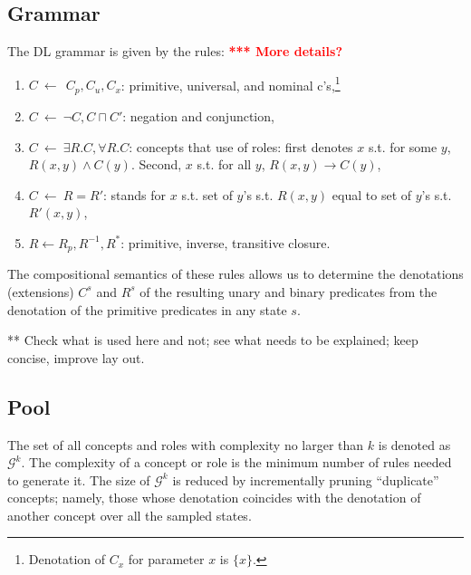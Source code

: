 \documentclass[letterpaper]{article} %
\renewcommand{\S}{\mathcal{S}}
\newcommand{\G}{\mathcal{G}}
\begin{document}
\subsection{Grammar}

The DL grammar is given by the rules: \textcolor{red}{\bf **** More details?}
\begin{enumerate}[{\small$\bullet$}]
  \item $C \ \leftarrow\ \ C_p, C_u, C_x$: primitive, universal, and nominal c's,\footnote{Denotation of $C_x$ for parameter $x$ is $\{x\}$.}
  \item $C \ \leftarrow\  \neg C, C \sqcap C'$: negation and conjunction, 
  \item $C \ \leftarrow\  \exists R.C , \forall R.C$: concepts that use of  roles: first denotes $x$ s.t. for some  $y$,  $R(x,y) \land C(y)$.
  Second,  $x$ s.t. for all $y$, $R(x,y) \rightarrow C(y)$,
  \item $C \ \leftarrow\  R=R'$: stands for $x$ s.t. set of $y$'s  s.t. $R(x,y)$ equal to set of $y$'s s.t. $R'(x,y)$,
    \item $R \leftarrow R_p, R^{-1}, R^*$: primitive, inverse, transitive closure.
 \end{enumerate}

The  compositional  semantics   of these rules allows us to determine the denotations (extensions)   $C^s$ and $R^s$  of
the resulting unary and binary predicates from the denotation of the primitive predicates in any  state $s$. 

** Check what is used here and not; see what needs to be explained; keep concise, improve lay out.


\subsection{Pool}

The set of all concepts and roles with complexity no larger than $k$ is
denoted as $\G^k$. The complexity of a concept or role is the minimum
number of rules needed to generate it. The size of $\G^k$ is reduced by
incrementally pruning ``duplicate'' concepts; namely, those whose denotation
coincides with the denotation of another concept over all the sampled states.
\end{document}
